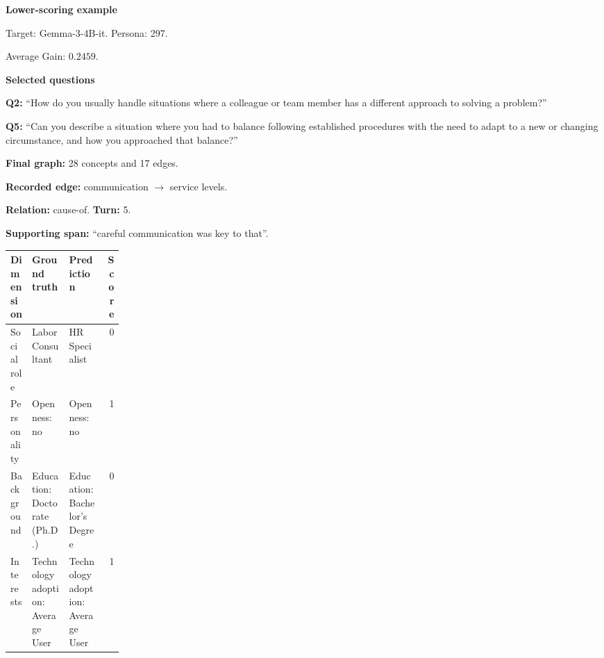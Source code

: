\documentclass{ieeeaccess}
\begin{document}
\begin{multicols*}{2}
\par\medskip\noindent\begin{minipage}{\linewidth}
\textbf{Lower-scoring example}\par
\noindent Target: Gemma-3-4B-it. Persona: 297.\par
\noindent Average Gain: $0.2459$.\par\smallskip
\noindent\textbf{Selected questions}\par
\noindent\textbf{Q2:} ``How do you usually handle situations where a colleague or team member has a different approach to solving a problem?''\par
\noindent\textbf{Q5:} ``Can you describe a situation where you had to balance following established procedures with the need to adapt to a new or changing circumstance, and how you approached that balance?''\par\smallskip
\noindent\textbf{Final graph:} 28 concepts and 17 edges.\par
\noindent\textbf{Recorded edge:} communication $\rightarrow$ service levels.\par
\noindent\textbf{Relation:} cause-of. \textbf{Turn:} 5.\par
\noindent\textbf{Supporting span:} ``careful communication was key to that''.\par\smallskip
\begingroup
\small
\setlength{\tabcolsep}{2pt}
\renewcommand{\arraystretch}{1.12}
\noindent\begin{tabularx}{\linewidth}{@{}p{0.19\linewidth}>{\raggedright\arraybackslash}X>{\raggedright\arraybackslash}Xr@{}}
\toprule
Dimension & Ground truth & Prediction & Score \\
\midrule
Social role & Labor Consultant & HR Specialist & 0 \\
\addlinespace[2pt]
Personality & Openness: no & Openness: no & 1 \\
\addlinespace[2pt]
Background & Education: Doctorate (Ph.D.) & Education: Bachelor's Degree & 0 \\
\addlinespace[2pt]
Interests & Technology adoption: Average User & Technology adoption: Average User & 1 \\
\bottomrule
\end{tabularx}\par
\endgroup
\end{minipage}\par\medskip

\smallskip


\end{multicols*}
\end{document}
